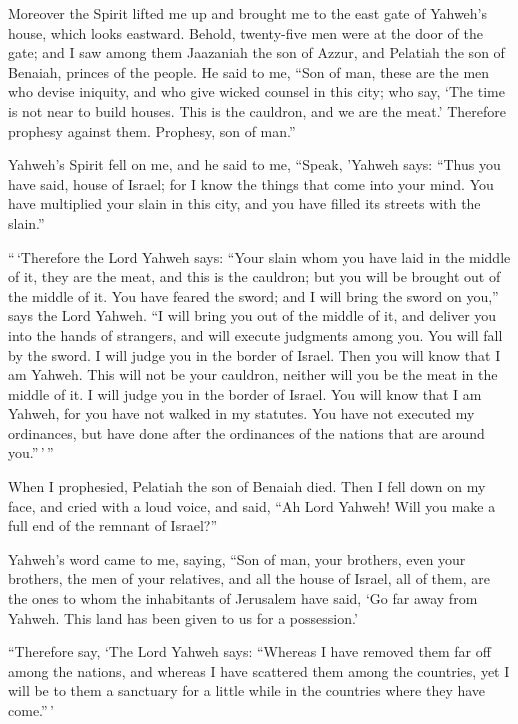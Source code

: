  Moreover the Spirit lifted me up and brought me to the
east gate of Yahweh's house, which looks eastward. Behold, twenty-five
men were at the door of the gate; and I saw among them Jaazaniah the son
of Azzur, and Pelatiah the son of Benaiah, princes of the people.
 He said to me, ``Son of man, these are the men who devise
iniquity, and who give wicked counsel in this city;  who
say, `The time is not near to build houses. This is the cauldron, and we
are the meat.'  Therefore prophesy against them. Prophesy,
son of man.''

 Yahweh's Spirit fell on me, and he said to me, ``Speak,
'Yahweh says: ``Thus you have said, house of Israel; for I know the
things that come into your mind.  You have multiplied your
slain in this city, and you have filled its streets with the slain.''

 ``\,`Therefore the Lord Yahweh says: ``Your slain whom
you have laid in the middle of it, they are the meat, and this is the
cauldron; but you will be brought out of the middle of it.
 You have feared the sword; and I will bring the sword on
you,'' says the Lord Yahweh.  ``I will bring you out of
the middle of it, and deliver you into the hands of strangers, and will
execute judgments among you.  You will fall by the sword.
I will judge you in the border of Israel. Then you will know that I am
Yahweh.  This will not be your cauldron, neither will you
be the meat in the middle of it. I will judge you in the border of
Israel.  You will know that I am Yahweh, for you have not
walked in my statutes. You have not executed my ordinances, but have
done after the ordinances of the nations that are around you.''\,'\,''

 When I prophesied, Pelatiah the son of Benaiah died.
Then I fell down on my face, and cried with a loud voice, and said, ``Ah
Lord Yahweh! Will you make a full end of the remnant of Israel?''

 Yahweh's word came to me, saying,  ``Son
of man, your brothers, even your brothers, the men of your relatives,
and all the house of Israel, all of them, are the ones to whom the
inhabitants of Jerusalem have said, `Go far away from Yahweh. This land
has been given to us for a possession.'

 ``Therefore say, `The Lord Yahweh says: ``Whereas I have
removed them far off among the nations, and whereas I have scattered
them among the countries, yet I will be to them a sanctuary for a little
while in the countries where they have come.''\,'

